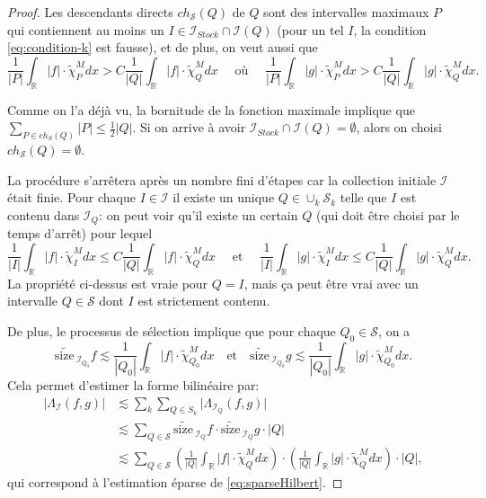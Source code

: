 \documentclass[11pt]{amsart}
\newcommand{\sssize}{\widetilde{\text{size}\,}}
\newcommand{\rr}{\mathbb}
\newcommand{\ii}{\mathscr}
\newcommand{\ic}{\mathcal}
\newcommand{\ci}{\tilde{\chi}}
\begin{document}
\begin{proof}
Les descendants directs $ch_{\ic S}(Q)$ de $Q$ sont des intervalles maximaux $P$ qui contiennent au moins un  $I \in \ii I_{Stock} \cap \ii I(Q)$ (pour un tel $I$, la condition \eqref{eq:condition-k} est fausse), et de plus, on veut aussi que 
\[
 \frac{1}{|P|} \int_{\rr R} |f| \cdot \ci_P^M dx > C \frac{1}{|Q|} \int_{\rr R} |f| \cdot \ci_{Q}^M dx \quad \text{ o\`u  } \quad \frac{1}{|P|} \int_{\rr R} |g| \cdot \ci_P^M dx > C \frac{1}{|Q|} \int_{\rr R} |g| \cdot \ci_{Q}^M dx.
 \]

Comme on l'a d\'ejà vu, la bornitude de la fonction maximale implique que $\sum_{P \in ch_{S}\left(Q\right)}|P| \leq \frac{1}{2}|Q|$. Si on arrive \`a avoir 
$\ii I_{Stock} \cap \ii I(Q)=\emptyset$, alors on choisi $ch_{\ic S}(Q)=\emptyset$.

La proc\'edure s'arr\^etera apr\`es un nombre fini d'\'etapes car la collection initiale $\ii I$ \'etait finie. Pour chaque $I \in \ii I$ il existe un unique 
$Q \in \cup_k \ic S_k$ telle que $I$ est contenu dans $\ii I_Q$: on peut voir qu'il existe un certain $Q$ (qui doit \^etre choisi par le temps d'arr\^et) pour lequel
\[
\frac{1}{|I|} \int_{\rr R} |f| \cdot \ci_I^M dx \leq C \frac{1}{|Q|} \int_{\rr R} |f| \cdot \ci_{Q}^M dx \quad   \text{    et     } \quad \frac{1}{|I|} \int_{\rr R} |g| \cdot \ci_I^M dx \leq C \frac{1}{|Q|} \int_{\rr R} |g| \cdot \ci_{Q}^M dx.
\]
La propri\'et\'e ci-dessus est vraie pour $Q=I$, mais \c{c}a peut \^etre vrai avec un intervalle $Q \in \ic S$ dont $I$ est strictement contenu.

De plus, le processus de s\'election implique que pour chaque $Q_0 \in \ic S$, on a
\[
\sssize_{\ii I_{Q_0}} f \lesssim \frac{1}{|Q_0|} \int_{\rr R} |f| \cdot \ci_{Q_0}^M dx \quad \text{et} \quad \sssize_{\ii I_{Q_0}} g \lesssim \frac{1}{|Q_0|} \int_{\rr R} |g| \cdot \ci_{Q_0}^M dx.
\]
Cela permet d'estimer la forme bilin\'eaire par:
\begin{align*}
\big| \Lambda_{\ii I }(f, g)\big| &\lesssim \sum_k \sum_{Q \in S_k}  \big| \Lambda_{\ii I_Q}(f,g) \big| \\
&\lesssim \sum_{Q \in \ic S} \sssize_{\ii I_Q} f \cdot \sssize_{\ii I_Q} g \cdot |Q| \\
&\lesssim \sum_{Q \in \ic S} \left(\frac{1}{|Q|} \int_{\rr R} |f| \cdot \ci_{Q}^M dx\right) \cdot \left(  \frac{1}{|Q|} \int_{\rr R} |g| \cdot \ci_{Q}^M dx\right) \cdot |Q|,
\end{align*}
qui correspond \`a l'estimation \'eparse de \eqref{eq:sparseHilbert}.
\end{proof}
\end{document}
